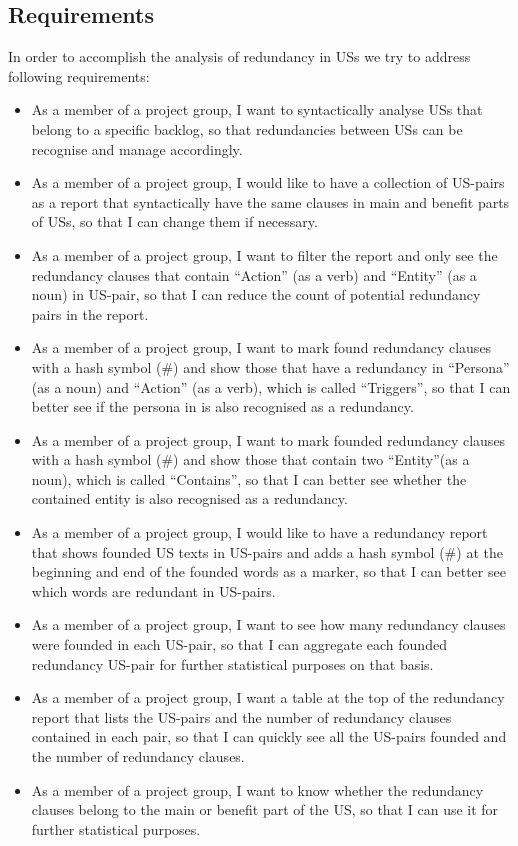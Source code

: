 \subsection{Requirements}\label{redundancy_requirement}
In order to accomplish the analysis of redundancy in USs we try to address following requirements:
\begin{itemize}
\item As a member of a project group, I want to syntactically analyse USs that belong to a specific backlog, so that redundancies between USs can be recognise and manage accordingly.
\item As a member of a project group, I would like to have a collection of US-pairs as a report that syntactically have the same clauses in main and benefit parts of USs, so that I can change them if necessary.
\item As a member of a project group, I want to filter the report and only see the redundancy clauses that contain \enquote{Action} (as a verb) and \enquote{Entity} (as a noun) in US-pair, so that I can reduce the count of potential redundancy pairs in the report.
\item As a member of a project group, I want to mark found redundancy clauses with a hash symbol (\#) and show those that have a redundancy in \enquote{Persona} (as a noun) and \enquote{Action} (as a verb), which is called \enquote{Triggers}, so that I can better see if the persona in is also recognised as a redundancy.
\item As a member of a project group, I want to mark founded redundancy clauses with a hash symbol (\#) and show those that contain two \enquote{Entity}(as a noun), which is called \enquote{Contains}, so that I can better see whether the contained entity is also recognised as a redundancy.
\item As a member of a project group, I would like to have a redundancy report that shows founded US texts in US-pairs and adds a hash symbol (\#) at the beginning and end of the founded words as a marker, so that I can better see which words are redundant in US-pairs.
\item As a member of a project group, I want to see how many redundancy clauses were founded in each US-pair, so that I can aggregate each founded redundancy US-pair for further statistical purposes on that basis.
\item As a member of a project group, I want a table at the top of the redundancy report that lists the US-pairs and the number of redundancy clauses contained in each pair, so that I can quickly see all the US-pairs founded and the number of redundancy clauses. 
\item As a member of a project group, I want to know whether the redundancy clauses belong to the main or benefit part of the US, so that I can use it for further statistical purposes.
\end{itemize}


